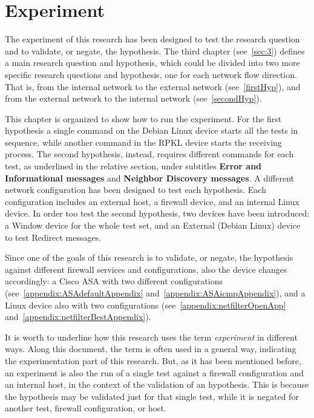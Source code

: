 \documentclass[12pt]{article}
\begin{document}
\pagebreak

\section{Experiment}
\label{sec:5}

The experiment of this research has been designed to test the research question and to validate, or negate, the hypothesis. The third chapter (see~\cref{sec:3}) defines a main research question and hypothesis, which could be divided into two more specific research questions and hypothesis, one for each network flow direction. That is, from the internal network to the external network (see~\ref{firstHyp}), and from the external network to the internal network (see~\ref{secondHyp}).

This chapter is organized to show how to run the experiment. For the first hypothesis a single command on the Debian Linux device starts all the tests in sequence, while another command in the RPKL device starts the receiving process. The second hypothesis, instead, requires different commands for each test, as underlined in the relative section, under subtitles \textbf{Error and Informational messages} and \textbf{Neighbor Discovery messages}. A different network configuration has been designed to test each hypothesis. Each configuration includes an external host, a firewall device, and an internal Linux device. In order too test the second hypothesis, two devices have been introduced: a Window device for the whole test set, and an External (Debian Linux) device to test Redirect messages.

Since one of the goals of this research is to validate, or negate, the hypothesis against different firewall services and configurations, also the device changes accordingly: a Cisco ASA with two different configurations (see~\cref{appendix:ASAdefaultAppendix} and~\cref{appendix:ASAicmpAppendix}), and a Linux device also with two configurations (see~\cref{appendix:netfilterOpenApp} and~\cref{appendix:netfilterBestAppendix}).

It is worth to underline how this research uses the term \textit{experiment} in different ways. Along this document, the term is often used in a general way, indicating the experimentation part of this research. But, as it has been mentioned before, an experiment is also the run of a single test against a firewall configuration and an internal host, in the context of the validation of an hypothesis. This is because the hypothesis may be validated just for that single test, while it is negated for another test, firewall configuration, or host. 
\end{document}
